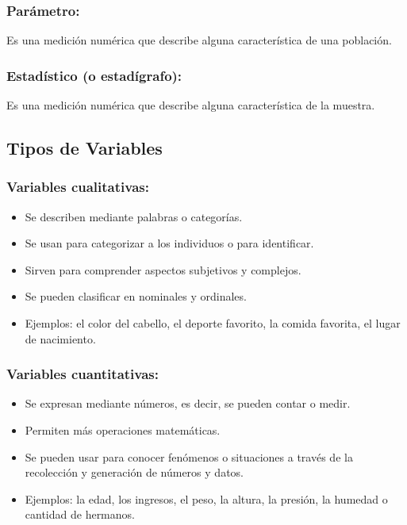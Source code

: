 \documentclass[12pt, letterpaper]{article}
\begin{document}
\subsubsection{Parámetro:} %
Es una medición numérica que describe alguna característica de una población.

\subsubsection{Estadístico (o estadígrafo):} %
Es una medición numérica que describe alguna característica de la muestra.

\subsection{Tipos de Variables}

\subsubsection{Variables cualitativas:} %
\begin{itemize}
	\item Se describen mediante palabras o categorías.
	\item Se usan para categorizar a los individuos o para identificar.
	\item Sirven para comprender aspectos subjetivos y complejos.
	\item Se pueden clasificar en nominales y ordinales.
	\item Ejemplos: el color del cabello, el deporte favorito, la comida favorita, el lugar de nacimiento.
\end{itemize}

\subsubsection{Variables cuantitativas:} %
\begin{itemize}
	\item Se expresan mediante números, es decir, se pueden contar o medir.
	\item Permiten más operaciones matemáticas.
	\item Se pueden usar para conocer fenómenos o situaciones a través de la recolección y generación de números y datos.
	\item Ejemplos: la edad, los ingresos, el peso, la altura, la presión, la humedad o cantidad de hermanos.
\end{itemize}
\end{document}
